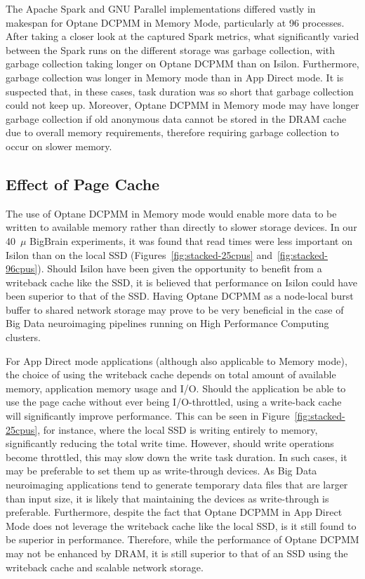 \documentclass[conference]{IEEEtran}
\newcommand{\bigbrain}{BigBrain\xspace}
\begin{document}
The Apache Spark and GNU Parallel implementations differed vastly in makespan 
for Optane DCPMM in Memory Mode, particularly at 96 processes. After taking a closer look at
the captured Spark metrics, what significantly varied between the Spark runs on
the different storage was garbage collection, with garbage collection taking longer on Optane DCPMM 
than on Isilon. Furthermore, garbage collection was longer in Memory mode than in
App Direct mode. It is suspected that, in these cases, task duration was so short
that garbage collection could not keep up. Moreover, Optane DCPMM in Memory mode may have longer
garbage collection if old anonymous data cannot be stored in the DRAM cache due to overall memory 
requirements, therefore requiring garbage collection to occur on slower memory.

\subsection{Effect of Page Cache}

The use of Optane DCPMM in Memory mode would enable more data to be written to available memory
rather than directly to slower storage devices. In our 40~$\mu$ \bigbrain experiments, it was found
that read times were less important on Isilon than on the local SSD (Figures~\ref{fig:stacked-25cpus}
and~\ref{fig:stacked-96cpus}). Should Isilon have been given the opportunity to benefit from a 
writeback cache like the SSD, it is believed that performance on Isilon could have been superior 
to that of the SSD. Having Optane DCPMM as a node-local burst buffer to shared network storage 
may prove to be very beneficial in the case of Big Data neuroimaging pipelines running on
High Performance Computing clusters.

For App Direct mode applications (although also applicable to Memory mode), the 
choice of using the writeback cache depends on total amount of available memory, application
memory usage and I/O. Should the application be able to use the page cache without ever being
I/O-throttled, using a write-back cache will significantly improve performance. This can 
be seen in Figure~\ref{fig:stacked-25cpus}, for instance, where the local SSD is writing
entirely to memory, significantly reducing the total write time. However, should write operations
become throttled, this may slow down the write task duration. In such cases,
it may be preferable to set them up as write-through devices. As Big Data neuroimaging applications
tend to generate temporary data files that are larger than input size, it is likely that maintaining the
devices as write-through is preferable. Furthermore, despite the fact that Optane DCPMM in App Direct Mode does
not leverage the writeback cache like the local SSD, is it still found to be superior in performance.
Therefore, while the performance of Optane DCPMM may not be enhanced by DRAM, it is still superior to that of
an SSD using the writeback cache and scalable network storage.
\end{document}
